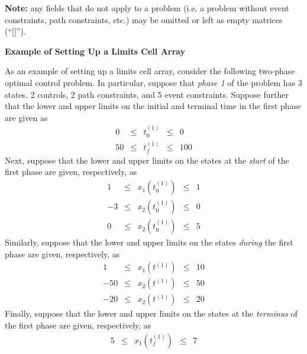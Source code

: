 \documentclass[10pt,final]{report}
\newcounter{example}[chapter]
\newenvironment{shadedframe}{%
  \def\FrameCommand{\fcolorbox{black}{shadecolor}}%
  \MakeFramed {\FrameRestore}}
{\endMakeFramed}
\begin{document}
{\noindent}{\bf Note:} any fields that do not apply to a problem (i.e. a problem without event constraints, path constraints, etc.) may be omitted or left as empty matrices (``[]'').

\begin{shadedframe}
{\noindent}{\bf Example of Setting Up a Limits Cell Array}
\vspace{12pt}

As an example of setting up a limits cell array,
consider the following two-phase optimal control problem.  In
particular, suppose that {\em phase 1} of the problem has 3 states, 2
controls, 2 path constraints, and 5 event constraints.  Suppose
further that the lower and upper limits on the initial and terminal
time in the first phase are given as
\begin{displaymath}
  \begin{array}{rcccr}
    0 & \leq  & t_0^{(1)} & \leq & 0 \\
    50 & \leq & t_f^{(1)} & \leq & 100
  \end{array}
\end{displaymath}
Next, suppose that the lower and upper limits on the states at the
{\em start} of the first phase are given, respectively, as
\begin{displaymath}
  \begin{array}{rcccr}
    1 & \leq & x_1(t_0^{(1)}) & \leq & 1 \\
    -3 & \leq & x_2(t_0^{(1)}) & \leq & 0 \\
    0 & \leq & x_2(t_0^{(1)}) & \leq & 5
  \end{array}
\end{displaymath}
Similarly, suppose that the lower and upper limits on the states
{\em during}  the first phase are given, respectively, as
\begin{displaymath}
  \begin{array}{rcccr}
    1 & \leq & x_1(t^{(1)}) & \leq & 10 \\
    -50 & \leq & x_2(t^{(1)}) & \leq & 50 \\
    -20 & \leq & x_2(t^{(1)}) & \leq & 20
  \end{array}
\end{displaymath}
Finally, suppose that the lower and upper limits on the states at the
{\em terminus} of the first phase are given, respectively, as
\begin{displaymath}
  \begin{array}{rcccr}
    5 & \leq & x_1(t_f^{(1)}) & \leq & 7 \\

\end{array}
\end{displaymath}
\end{shadedframe}
\end{document}
